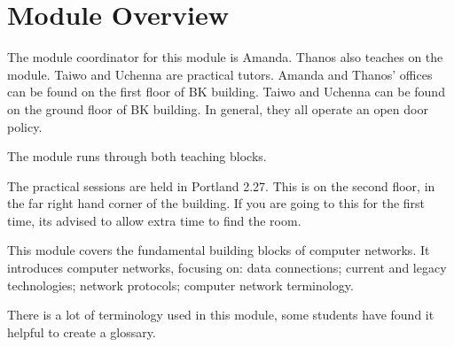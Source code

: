 
\section*{Module Overview}
The module coordinator for this module is Amanda. Thanos also teaches on the module. Taiwo and Uchenna are practical tutors. Amanda and Thanos' offices can be found on the first floor of BK building. Taiwo and Uchenna can be found on the ground floor of BK building. In general, they all operate an open door policy. 

The module runs through both teaching blocks. 

The practical sessions are held in Portland 2.27. This is on the second floor, in the far right hand corner of the building. If you are going to this for the first time, its advised to allow extra time to find the room.

This module covers the fundamental building blocks of computer networks. It introduces computer networks, focusing on: data connections; current and legacy technologies; network protocols; computer network terminology.

There is a lot of terminology used in this module, some students have found it helpful to create a glossary. 


